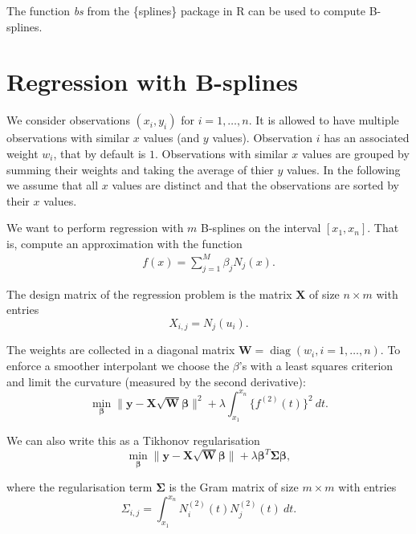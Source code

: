 \documentclass[a4paper]{scrartcl}
\newcommand{\vv}[1]{\ensuremath{\bm{#1}}}
\newcommand{\mat}[1]{\ensuremath{\bm{#1}}}
\newcommand{\T}[1]{\ensuremath{{#1}^{T}}}
\newcommand\dd{\ensuremath{\:d}}
\DeclareMathOperator\diag{diag}
\begin{document}
The function \textit{bs} from the \{splines\} package in R can be used to compute B-splines.


\section{Regression with B-splines}
\label{sec:regression}

We consider observations $(x_i, y_i)$ for $i = 1, \ldots, n$. 
It is allowed to have multiple observations with similar $x$ values (and $y$ values).
Observation $i$ has an associated weight $w_i$, that by default is $1$.
Observations with similar $x$ values are grouped by summing their weights and taking the average of thier $y$ values.
In the following we assume that all $x$ values are distinct and that the observations are sorted by their $x$ values.

We want to perform regression with $m$ B-splines on the interval $[x_1, x_n]$.
That is, compute an approximation with the function
\begin{align*}
    f(x) = \sum_{j=1}^M \beta_j N_j(x).
\end{align*}

The design matrix of the regression problem is the matrix $\mat X$ of size $n\times m$ with entries
\begin{equation*}
    X_{i,j} = N_j(u_i).
\end{equation*}

The weights are collected in a diagonal matrix $\mat W = \diag(w_i, i = 1, \ldots, n)$.
To enforce a smoother interpolant we choose the $\beta$'s with a least squares criterion and limit the curvature (measured by the second derivative):
\begin{equation*}
    \min_{\vv \beta} \|\vv y - \mat X \sqrt{\mat W} \vv \beta\|^2 + \lambda \int_{x_1}^{x_n} \bigl\{f^{(2)}(t)\bigr\}^2 \dd t.
\end{equation*}

We can also write this as a Tikhonov regularisation
\begin{equation*}
    \min_{\vv \beta} \|\vv y - \mat X \sqrt{\mat W} \vv \beta\| + \lambda \T{\vv\beta} \mat\Sigma \vv\beta,
\end{equation*}

where the regularisation term $\mat\Sigma$ is the Gram matrix of size $m\times m$ with entries
\begin{equation*}
    \Sigma_{i,j} =
    \int_{x_1}^{x_n} N_i^{(2)}(t) N_j^{(2)}(t) \dd t.
\end{equation*}
\end{document}

